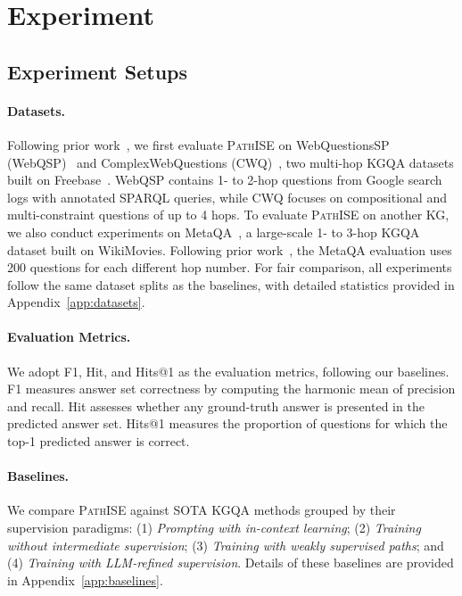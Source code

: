 \documentclass{article}
\newcommand{\framework}{\textsc{PathISE}\xspace}
\begin{document}
\section{Experiment}\label{sec:experiment}

\subsection{Experiment Setups}

\paragraph{Datasets.}
Following prior work~\citep{mavromatis_gnnrag_2025, luo_gcr_2025, ma_dp_2025, luo_rog_2024}, we first evaluate \framework{} on WebQuestionsSP (WebQSP)~\citep{yih_webqsp_2016} and ComplexWebQuestions (CWQ)~\citep{talmor_cwq_2018}, two multi-hop KGQA datasets built on Freebase~\citep{bollacker_freebase_2008}.
WebQSP contains 1- to 2-hop questions from Google search logs with annotated SPARQL queries, while CWQ focuses on compositional and multi-constraint questions of up to 4 hops.
To evaluate \framework{} on another KG, we also conduct experiments on MetaQA~\citep{puerto_metaqa_2023}, a large-scale 1- to 3-hop KGQA dataset built on WikiMovies.
Following prior work~\citep{ma_dp_2025, ma_debate_2025}, the MetaQA evaluation uses 200 questions for each different hop number.
For fair comparison, all experiments follow the same dataset splits as the baselines, with detailed statistics provided in Appendix~\ref{app:datasets}.


\paragraph{Evaluation Metrics.}
We adopt F1, Hit, and Hits@1 as the evaluation metrics, following our baselines. F1 measures answer set correctness by computing the harmonic mean of precision and recall.
Hit assesses whether any ground-truth answer is presented in the predicted answer set.
Hits@1 measures the proportion of questions for which the top-1 predicted answer is correct.


\paragraph{Baselines.} We compare \framework against  SOTA KGQA methods grouped by their supervision paradigms:
(1) \textit{Prompting with in-context learning};
(2) \textit{Training without intermediate supervision};
(3) \textit{Training with weakly supervised paths};
and (4) \textit{Training with LLM-refined supervision}.
Details of these baselines are provided in Appendix~\ref{app:baselines}.
\end{document}

